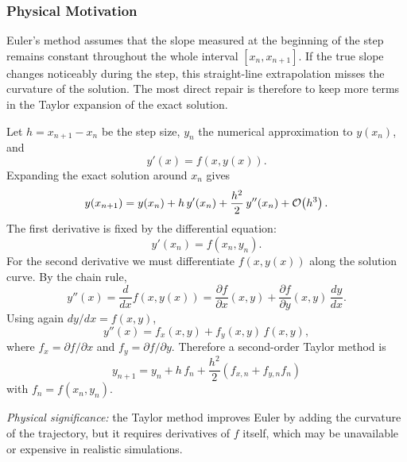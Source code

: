 \subsubsection*{Physical Motivation}
Euler's method assumes that the slope measured at the beginning of the step
remains constant throughout the whole interval $[x_n,x_{n+1}]$. If the true
slope changes noticeably during the step, this straight-line extrapolation
misses the curvature of the solution. The most direct repair is therefore to
keep more terms in the Taylor expansion of the exact solution.

Let $h=x_{n+1}-x_n$ be the step size, $y_n$ the numerical approximation to
$y(x_n)$, and
\begin{equation}
    y'(x)=f(x,y(x)).
    \label{eq:lec06:ode-standard}
\end{equation}
Expanding the exact solution around $x_n$ gives
\begin{equation}
    y(x_{n+1})
    = y(x_n)+h\,y'(x_n)+\frac{h^2}{2}\,y''(x_n)+\mathcal{O}\!\left(h^3\right).
    \label{eq:lec06:taylor-solution}
\end{equation}
The first derivative is fixed by the differential equation:
\begin{equation}
    y'(x_n)=f(x_n,y_n).
    \label{eq:lec06:first-derivative}
\end{equation}
For the second derivative we must differentiate $f(x,y(x))$ along the
solution curve. By the chain rule,
\begin{equation}
    y''(x)
    = \frac{d}{dx}f(x,y(x))
    = \frac{\partial f}{\partial x}(x,y)
      +\frac{\partial f}{\partial y}(x,y)\,\frac{dy}{dx}.
    \label{eq:lec06:chain-rule}
\end{equation}
Using again $dy/dx=f(x,y)$,
\begin{equation}
    y''(x)
    = f_x(x,y)+f_y(x,y)\,f(x,y),
    \label{eq:lec06:second-derivative}
\end{equation}
where $f_x=\partial f/\partial x$ and $f_y=\partial f/\partial y$. Therefore
a second-order Taylor method is
\begin{equation}
    \boxed{
    y_{n+1}
    = y_n+h\,f_n+\frac{h^2}{2}\left(f_{x,n}+f_{y,n}f_n\right)}
    \label{eq:lec06:taylor-method}
\end{equation}
with $f_n=f(x_n,y_n)$.

\textit{Physical significance:} the Taylor method improves Euler by adding
the curvature of the trajectory, but it requires derivatives of $f$ itself,
which may be unavailable or expensive in realistic simulations.

